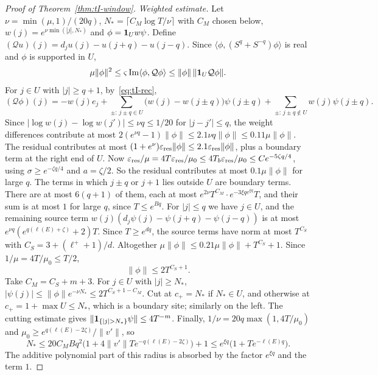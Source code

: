 \begin{proof}[Proof of Theorem~\ref{thm:tI-window}]
\emph{Weighted estimate.} Let $\nu=\min(\mu,1)/(20q)$, $N_*=\lceil C_M\log T/\nu\rceil$ with $C_M$ chosen below, $w(j)=e^{\nu\min(|j|,N_*)}$ and $\phi=\mathbf 1_Uw\psi$. Define $(\mathcal Qu)(j)=d_ju(j)-u(j+q)-u(j-q)$. Since $\langle\phi,(S^q+S^{-q})\phi\rangle$ is real and $\phi$ is supported in $U$,
\[
\mu\|\phi\|^2\le\varsigma\operatorname{Im}\langle\phi,\mathcal Q\phi\rangle\le\|\phi\|\,\|\mathbf 1_U\mathcal Q\phi\|.
\]
For $j\in U$ with $|j|\ge q+1$, by~\eqref{eq:tI-rec},
\[
(\mathcal Q\phi)(j)=-w(j)e_j+\sum_{\pm:\,j\pm q\in U}\bigl(w(j)-w(j\pm q)\bigr)\psi(j\pm q)+\sum_{\pm:\,j\pm q\notin U}w(j)\psi(j\pm q).
\]
Since $|\log w(j)-\log w(j')|\le\nu q\le1/20$ for $|j-j'|\le q$, the weight differences contribute at most $2(e^{\nu q}-1)\|\phi\|\le2.1\nu q\|\phi\|\le0.11\mu\|\phi\|$. The residual contributes at most $(1+e^\nu)\varepsilon_{\mathrm{res}}\|\phi\|\le2.1\varepsilon_{\mathrm{res}}\|\phi\|$, plus a boundary term at the right end of $U$. Now $\varepsilon_{\mathrm{res}}/\mu=4T\varepsilon_{\mathrm{res}}/\mu_0\le4T_b\varepsilon_{\mathrm{res}}/\mu_0\le Ce^{-5\zeta q/4}$, using $\sigma\ge e^{-\zeta q/4}$ and $a=\zeta/2$. So the residual contributes at most $0.1\mu\|\phi\|$ for large $q$. The terms in which $j\pm q$ or $j+1$ lies outside $U$ are boundary terms. There are at most $6(q+1)$ of them, each at most $e^{2\nu}T^{C_M}\cdot e^{-3\xi qe^{\xi q}}T$, and their sum is at most $1$ for large $q$, since $T\le e^{Bq}$. For $|j|\le q$ we have $j\in U$, and the remaining source term $w(j)(d_j\psi(j)-\psi(j+q)-\psi(j-q))$ is at most $e^{\nu q}(e^{q(\ell(E)+\zeta)}+2)T$. Since $T\ge e^{dq}$, the source terms have norm at most $T^{C_S}$ with $C_S=3+(\ell^++1)/d$. Altogether $\mu\|\phi\|\le0.21\mu\|\phi\|+T^{C_S}+1$. Since $1/\mu=4T/\mu_0\le T/2$,
\[
\|\phi\|\le2T^{C_S+1}.
\]
Take $C_M=C_S+m+3$. For $j\in U$ with $|j|\ge N_*$, $|\psi(j)|\le\|\phi\|e^{-\nu N_*}\le2T^{C_S+1-C_M}$. Cut at $c_+=N_*$ if $N_*\in U$, and otherwise at $c_+=1+\max U\le N_*$, which is a boundary site; similarly on the left. The cutting estimate gives $\|\un_{\{|j|>N_*\}}\psi\|\le4T^{-m}$. Finally, $1/\nu=20q\max(1,4T/\mu_0)$ and $\mu_0\ge e^{q(\ell(E)-2\zeta)}/\|v'\|$, so
\[
N_*\le20C_MBq^2\bigl(1+4\|v'\|Te^{-q(\ell(E)-2\zeta)}\bigr)+1\le e^{\xi q}\bigl(1+Te^{-\ell(E)q}\bigr).
\]
The additive polynomial part of this radius is absorbed by the factor $e^{\xi q}$ and the term $1$.


\end{proof}
